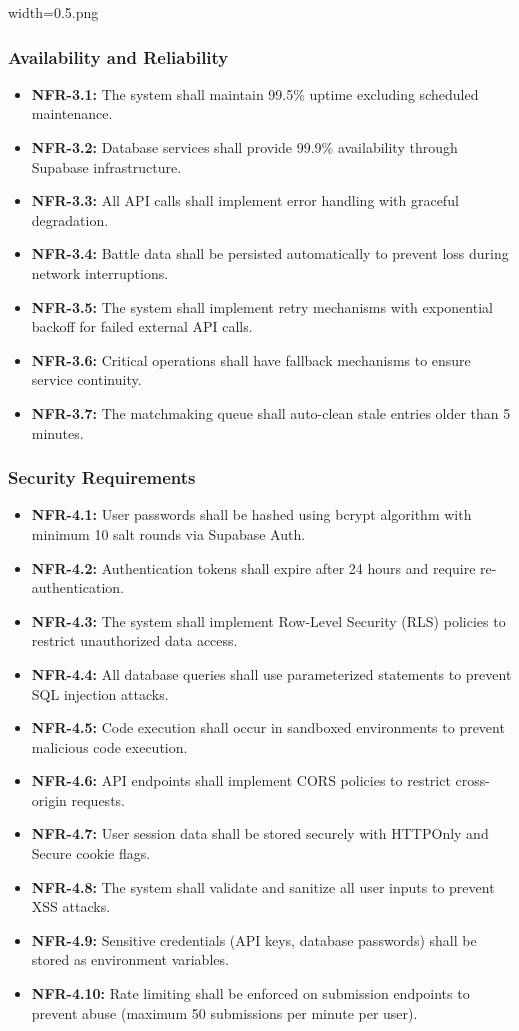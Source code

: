 width=0.5\linewidthimage.png\documentclass[12pt,a4paper]{article}
\begin{document}
\subsubsection{Availability and Reliability}
\begin{itemize}
\item \textbf{NFR-3.1:} The system shall maintain 99.5\% uptime excluding scheduled maintenance.
\item \textbf{NFR-3.2:} Database services shall provide 99.9\% availability through Supabase infrastructure.
\item \textbf{NFR-3.3:} All API calls shall implement error handling with graceful degradation.
\item \textbf{NFR-3.4:} Battle data shall be persisted automatically to prevent loss during network interruptions.
\item \textbf{NFR-3.5:} The system shall implement retry mechanisms with exponential backoff for failed external API calls.
\item \textbf{NFR-3.6:} Critical operations shall have fallback mechanisms to ensure service continuity.
\item \textbf{NFR-3.7:} The matchmaking queue shall auto-clean stale entries older than 5 minutes.
\end{itemize}

\subsubsection{Security Requirements}
\begin{itemize}
\item \textbf{NFR-4.1:} User passwords shall be hashed using bcrypt algorithm with minimum 10 salt rounds via Supabase Auth.
\item \textbf{NFR-4.2:} Authentication tokens shall expire after 24 hours and require re-authentication.
\item \textbf{NFR-4.3:} The system shall implement Row-Level Security (RLS) policies to restrict unauthorized data access.
\item \textbf{NFR-4.4:} All database queries shall use parameterized statements to prevent SQL injection attacks.
\item \textbf{NFR-4.5:} Code execution shall occur in sandboxed environments to prevent malicious code execution.
\item \textbf{NFR-4.6:} API endpoints shall implement CORS policies to restrict cross-origin requests.
\item \textbf{NFR-4.7:} User session data shall be stored securely with HTTPOnly and Secure cookie flags.
\item \textbf{NFR-4.8:} The system shall validate and sanitize all user inputs to prevent XSS attacks.
\item \textbf{NFR-4.9:} Sensitive credentials (API keys, database passwords) shall be stored as environment variables.
\item \textbf{NFR-4.10:} Rate limiting shall be enforced on submission endpoints to prevent abuse (maximum 50 submissions per minute per user).
\end{itemize}
\end{document}
